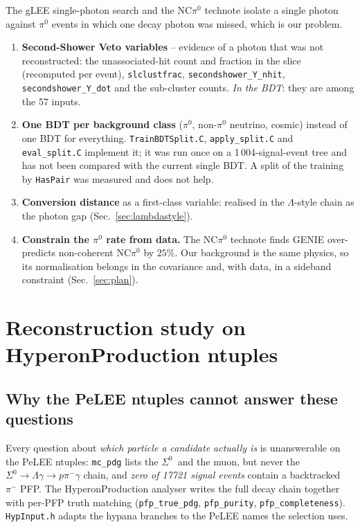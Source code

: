 \documentclass[11pt,a4paper]{article}
\newcommand{\Szero}{\ensuremath{\Sigma^{0}}}
\newcommand{\Lam}{\ensuremath{\Lambda}}
\begin{document}
The gLEE single-photon search and the NC$\pi^0$ technote isolate a single photon
against $\pi^0$ events in which one decay photon was missed, which is our problem.
\begin{enumerate}
  \item \textbf{Second-Shower Veto variables} -- evidence of a photon that was not
        reconstructed: the unassociated-hit count and fraction in the slice
        (recomputed per event), \texttt{slclustfrac}, \texttt{secondshower\_Y\_nhit},
        \texttt{secondshower\_Y\_dot} and the sub-cluster counts. \emph{In the BDT}:
        they are among the 57 inputs.
  \item \textbf{One BDT per background class} ($\pi^0$, non-$\pi^0$ neutrino, cosmic)
        instead of one BDT for everything. \texttt{TrainBDTSplit.C},
        \texttt{apply\_split.C} and \texttt{eval\_split.C} implement it; it was run
        once on a 1\,004-signal-event tree and has not been compared with the
        current single BDT. A split of the training by \texttt{HasPair} was measured
        and does not help.
  \item \textbf{Conversion distance} as a first-class variable: realised in the
        \Lam-style chain as the photon gap (Sec.~\ref{sec:lambdastyle}).
  \item \textbf{Constrain the $\pi^0$ rate from data.} The NC$\pi^0$ technote finds
        GENIE over-predicts non-coherent NC$\pi^0$ by $25\%$. Our background is the
        same physics, so its normalisation belongs in the covariance and, with data,
        in a sideband constraint (Sec.~\ref{sec:plan}).
\end{enumerate}

\section{Reconstruction study on HyperonProduction ntuples}
\label{sec:recostudy}

\subsection{Why the PeLEE ntuples cannot answer these questions}

Every question about \emph{which particle a candidate actually is} is unanswerable
on the PeLEE ntuples: \texttt{mc\_pdg} lists the \Szero\ and the muon, but never the
$\Szero \to \Lam\gamma \to p\pi^-\gamma$ chain, and \emph{zero of 17721 signal events}
contain a backtracked $\pi^-$ PFP. The HyperonProduction analyser writes the full
decay chain together with per-PFP truth matching (\texttt{pfp\_true\_pdg},
\texttt{pfp\_purity}, \texttt{pfp\_completeness}). \texttt{HypInput.h} adapts the
hypana branches to the PeLEE names the selection uses.
\end{document}
